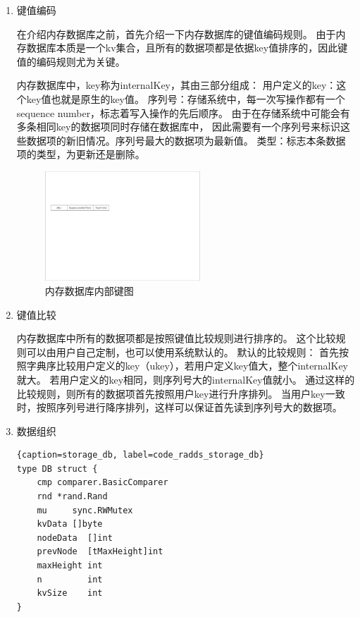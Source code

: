 		\begin{enumerate}
			\item 键值编码
			
			在介绍内存数据库之前，首先介绍一下内存数据库的键值编码规则。
			由于内存数据库本质是一个kv集合，且所有的数据项都是依据key值排序的，因此键值的编码规则尤为关键。

			内存数据库中，key称为internalKey，其由三部分组成：
			用户定义的key：这个key值也就是原生的key值。
			序列号：存储系统中，每一次写操作都有一个sequence number，标志着写入操作的先后顺序。
			由于在存储系统中可能会有多条相同key的数据项同时存储在数据库中，
			因此需要有一个序列号来标识这些数据项的新旧情况。序列号最大的数据项为最新值。
			类型：标志本条数据项的类型，为更新还是删除。

			\begin{figure}[H]
				\centering
				\includegraphics[width=0.55\textwidth]{pdf/internalkey}
				\caption{内存数据库内部键图}
				\label{internalkey}
			\end{figure}

			\item 键值比较
			
			内存数据库中所有的数据项都是按照键值比较规则进行排序的。
			这个比较规则可以由用户自己定制，也可以使用系统默认的。
			默认的比较规则：
			首先按照字典序比较用户定义的key（ukey），若用户定义key值大，整个internalKey就大。
			若用户定义的key相同，则序列号大的internalKey值就小。
			通过这样的比较规则，则所有的数据项首先按照用户key进行升序排列。
			当用户key一致时，按照序列号进行降序排列，这样可以保证首先读到序列号大的数据项。

			
			\item 数据组织
			
			\begin{lstlisting}{caption=storage_db, label=code_radds_storage_db}
type DB struct {
	cmp comparer.BasicComparer
	rnd *rand.Rand
	mu     sync.RWMutex
	kvData []byte
	nodeData  []int
	prevNode  [tMaxHeight]int
	maxHeight int
	n         int
	kvSize    int
}
		\end{lstlisting}
				

\end{enumerate}
